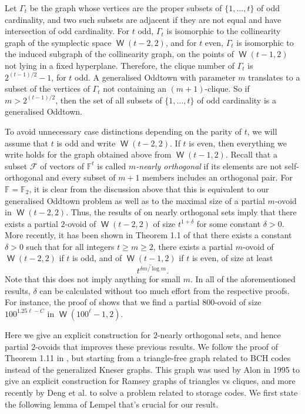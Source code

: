 \documentclass[a4paper,11pt]{amsproc}
\theoremstyle{plain}
\theoremstyle{definition}
\newcommand{\F}{{\mathbb F}}
\newcommand{\cF}{{\mathcal F}}
\newcommand{\<}{\langle}
\renewcommand{\>}{\rangle} %
\DeclareMathOperator\w{\mathsf{W}}
\begin{document}
Let $\Gamma_t$ be the graph whose vertices are the proper subsets of $\{1,\ldots, t\}$ of odd cardinality,
and two such subsets are adjacent if they are not equal and have intersection of odd cardinality.
For $t$ odd, $\Gamma_t$ is isomorphic to the collinearity graph of the symplectic space $\w(t-2,2)$,
and for $t$ even, $\Gamma_t$ is isomorphic to the induced subgraph of the collinearity graph, on the points of
$\w(t-1,2)$ not lying in a fixed hyperplane. Therefore, the clique number of $\Gamma_t$ is $2^{(t-1)/2} - 1$, for $t$ odd.
A generalised Oddtown with parameter $m$ translates to a subset of the vertices of $\Gamma_t$
not containing an $(m+1)$-clique. So if $m>2^{(t-1)/2}$, then the set of all subsets of $\{1,\ldots,t\}$ of odd
cardinality is a generalised Oddtown.
 
To avoid unnecessary case distinctions depending on the parity of $t$, we will
assume that $t$ is odd and write $\w(t-2, 2)$. If $t$ is even, then everything we
write holds for the graph obtained above from $\w(t-1, 2)$.
Recall that a subset $\cF$ of vectors of $\F^t$ is called \emph{$m$-nearly orthogonal} if its 
elements are not self-orthogonal
and every subset of $m+1$ members includes an orthogonal pair.
For $\F = \F_2$, it is clear from the
discussion above that this is equivalent to our generalised Oddtown problem as well as to the maximal
size of a partial $m$-ovoid in $\w(t-2, 2)$. 
Thus, the results of \cite{Golovnev2022} on nearly orthogonal sets imply
 that there exists a partial $2$-ovoid of $\w(t-2, 2)$
of size $t^{1+\delta}$ for some constant $\delta > 0$.  More recently, it has been shown in Theorem 1.1 of \cite{Chawin24}
that there exists a constant $\delta > 0$ such that for all integers $t \geq m \geq 2$,
there exists a partial $m$-ovoid of $\w(t-2, 2)$ if $t$ is odd, and of
$\underline{\w(t-1,2)}$ if $t$ is even, of size at least
\[
 t^{\delta m/\log m}.
\]
Note that this does not imply anything for small $m$.
In all of the aforementioned results, $\delta$ can be calculated without too much effort
from the respective proofs. For instance, the proof of \cite[Theorem 1.1]{Chawin24} shows that we find a partial
$800$-ovoid of size $100^{1.25\ell-C}$ in $\w(100^\ell-1, 2)$.

Here we give an explicit construction for $2$-nearly orthogonal sets, and hence partial $2$-ovoids that improves these previous results. 
We follow the proof of Theorem 1.11 in \cite{Golovnev2022}, but starting from a triangle-free graph related to BCH codes instead of the generalized Kneser graphs. 
This graph was used by Alon in 1995 \cite{Alon95} to give an explicit construction for Ramsey graphs of triangles vs cliques, and more recently by Deng et al. \cite{DHWX2023} to solve a problem related to storage codes. 
We first state the following lemma of Lempel \cite{lempel} that's crucial for our result. 
\end{document}
